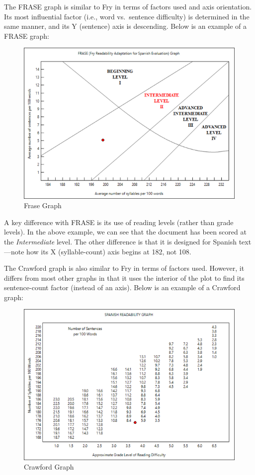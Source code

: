 \documentclass[
]{book}
\theoremstyle{definition}
\theoremstyle{definition}
\theoremstyle{definition}
\theoremstyle{definition}
\theoremstyle{remark}
\begin{document}
The FRASE graph is similar to Fry in terms of factors used and axis orientation. Its most influential factor (i.e., word vs.~sentence difficulty) is determined in the same manner, and its Y (sentence) axis is descending. Below is an example of a FRASE graph:

\begin{figure}[H]

{\centering \includegraphics[width=0.75\linewidth,]{Images/FraseGraph} 

}

\caption{Frase Graph}\label{fig:frase2}
\end{figure}

A key difference with FRASE is its use of reading levels (rather than grade levels). In the above example, we can see that the document has been scored at the \emph{Intermediate} level. The other difference is that it is designed for Spanish text---note how its X (syllable-count) axis begins at 182, not 108.

The Crawford graph is also similar to Fry in terms of factors used. However, it differs from most other graphs in that it uses the interior of the plot to find its sentence-count factor (instead of an axis). Below is an example of a Crawford graph:

\begin{figure}[H]

{\centering \includegraphics[width=0.75\linewidth,]{Images/CrawfordGraph} 

}

\caption{Crawford Graph}\label{fig:crawford2}
\end{figure}
\end{document}

